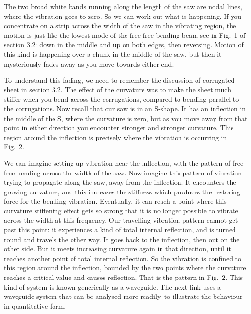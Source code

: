   The two broad white bands running along the length of the saw are nodal 
  lines, where the vibration goes to zero. So we can work out what is 
  happening. If you concentrate on a strip across the width of the saw in the 
  vibrating region, the motion is just like the lowest mode of the free-free 
  bending beam see in Fig.\ 1 of section 3.2: down in the middle and up on both 
  edges, then reversing. Motion of this kind is happening over a chunk in the 
  middle of the saw, but then it mysteriously fades away as you move towards 
  either end. 

  To understand this fading, we need to remember the discussion of corrugated 
  sheet in section 3.2. The effect of the curvature was to make the sheet much 
  stiffer when you bend across the corrugations, compared to bending parallel 
  to the corrugations. Now recall that our saw is in an S-shape. It has an 
  inflection in the middle of the S, where the curvature is zero, but as you 
  move away from that point in either direction you encounter stronger and 
  stronger curvature. This region around the inflection is precisely where the 
  vibration is occurring in Fig.\ 2. 

  We can imagine setting up vibration near the inflection, with the pattern of 
  free-free bending across the width of the saw. Now imagine this pattern of 
  vibration trying to propagate along the saw, away from the inflection. It 
  encounters the growing curvature, and this increases the stiffness which 
  produces the restoring force for the bending vibration. Eventually, it can 
  reach a point where this curvature stiffening effect gets so strong that it 
  is no longer possible to vibrate across the width at this frequency. Our 
  travelling vibration pattern cannot get past this point: it experiences a 
  kind of total internal reflection, and is turned round and travels the other 
  way. It goes back to the inflection, then out on the other side. But it meets 
  increasing curvature again in that direction, until it reaches another point 
  of total internal reflection. So the vibration is confined to this region 
  around the inflection, bounded by the two points where the curvature reaches 
  a critical value and causes reflection. That is the pattern in Fig.\ 2. This 
  kind of system is known generically as a waveguide. The next link uses a 
  waveguide system that can be analysed more readily, to illustrate the 
  behaviour in quantitative form. 

